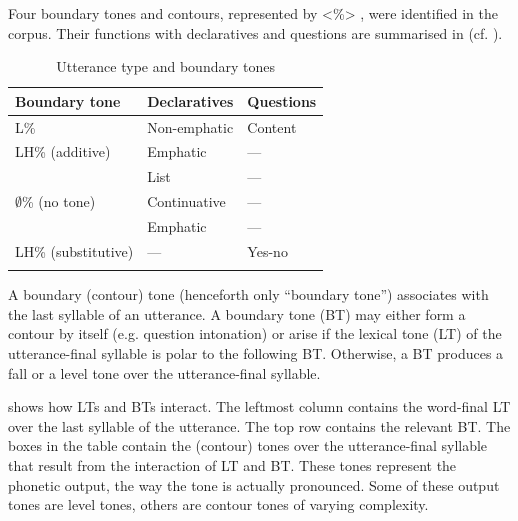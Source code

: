 Four boundary tones and contours, represented by <\%> \citep{Pierrehumbert1980}, were identified in the corpus. Their functions with declaratives and questions are summarised in  (cf. \citealt[18–20]{Cristo1998}).


\begin{table}
\caption{Utterance type and boundary tones}
\label{tab:key:3.5}

\begin{tabularx}{.8\textwidth}{XXl}
\lsptoprule

{Boundary tone} & {Declaratives} & {Questions}\\
\midrule
L\% & Non-emphatic & Content\\
LH\% (additive) & Emphatic & {}---\\
& List & {}---\\
${\emptyset}$\% (no tone) & Continuative & {}---\\
& Emphatic & {}---\\
LH\% (substitutive) & {}--- & Yes-no\\
\lspbottomrule
\end{tabularx}
\end{table}

A boundary (contour) tone (henceforth only “boundary tone”) associates with the last syllable of an utterance. A boundary tone (BT) may either form a contour by itself (e.g. question intonation) or arise if the lexical tone (LT) of the utterance-final syllable is polar to the following BT. Otherwise, a BT produces a fall or a level tone over the utterance-final syllable.

 shows how LTs and BTs interact. The leftmost column contains the word-final LT over the last syllable of the utterance. The top row contains the relevant BT. The boxes in the table contain the (contour) tones over the utterance-final syllable that result from the interaction of LT and BT. These tones represent the phonetic output, the way the tone is actually pronounced. Some of these output tones are level tones, others are contour tones of varying complexity.

